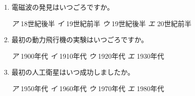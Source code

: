 \documentclass[dvipdfmx]{jsarticle}
\newcommand{\sentakusi}[4]{
\hspace{.3zw}
\emph{ア}\hspace{1zw} #1 \hspace{2zw} \emph{イ} \hspace{1zw}#2 \hspace{2zw}\emph{ウ}\hspace{1zw} #3 \hspace{2zw}\emph{エ}\hspace{1zw} #4

}
\begin{document}
\begin{enumerate}
\item 電磁波の発見はいつごろですか。

\sentakusi{18世紀後半}{19世紀前半}{19世紀後半}{20世紀前半}

\item 最初の動力飛行機の実験はいつごろですか。

\sentakusi{1900年代}{1910年代}{1920年代}{1930年代}

\item 最初の人工衛星はいつ成功しましたか。

\sentakusi{1950年代}{1960年代}{1970年代}{1980年代}



\end{enumerate}







%
%
\end{document}
